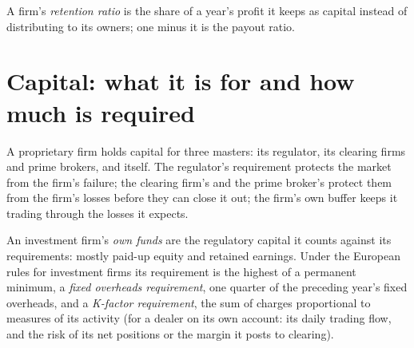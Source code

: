 \begin{definition}\label{def:fm:the-proprietary-market-making-firm:retention}
A firm's \emph{retention ratio} is the share of a year's profit it keeps as capital instead of distributing to its owners;
one minus it is the payout ratio.
\end{definition}

\section{Capital: what it is for and how much is required}

A proprietary firm holds capital for three masters: its regulator, its clearing firms and prime brokers, and itself. The regulator's requirement
protects the market from the firm's failure; the clearing firm's and the prime broker's protect them from the firm's losses before they can close
it out; the firm's own buffer keeps it trading through the losses it expects.

\begin{definition}\label{def:fm:the-proprietary-market-making-firm:ownfunds}
An investment firm's \emph{own funds} are the regulatory capital it counts against its requirements: mostly paid-up equity and
retained earnings. Under the European rules for investment firms its requirement is the highest of a permanent minimum, a \emph{fixed overheads
requirement}, one quarter of the preceding year's fixed overheads, and a \emph{K-factor
requirement}, the sum of charges proportional to measures of its activity (for a dealer on its own account: its daily
trading flow, and the risk of its net positions or the margin it posts to clearing).
\end{definition}

